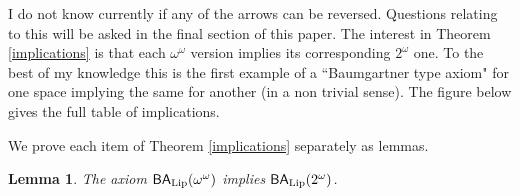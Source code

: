 \documentclass[leqno,11pt]{amsart}
\newtheorem{lemma}[theorem]{Lemma}
\theoremstyle{definition}
\theoremstyle{remark}
\def\BA{\mathsf{BA}}
\def\baire{\omega^\omega}
\def\cantor{2^\omega}
\begin{document}
I do not know currently if any of the arrows can be reversed. Questions relating to this will be asked in the final section of this paper. The interest in Theorem \ref{implications} is that each $\baire$ version implies its corresponding $\cantor$ one. To the best of my knowledge this is the first example of a ``Baumgartner type axiom" for one space implying the same for another (in a non trivial sense). The figure below gives the full table of implications.
 \begin{figure}[h]\label{figure}
\centering
  
 \end{figure}



We prove each item of Theorem \ref{implications} separately as lemmas.

\begin{lemma}
    The axiom $\BA_{\rm Lip}(\baire)$ implies $\BA_{\rm Lip}(\cantor)$. \label{firstlemma}
\end{lemma}
\end{document}
